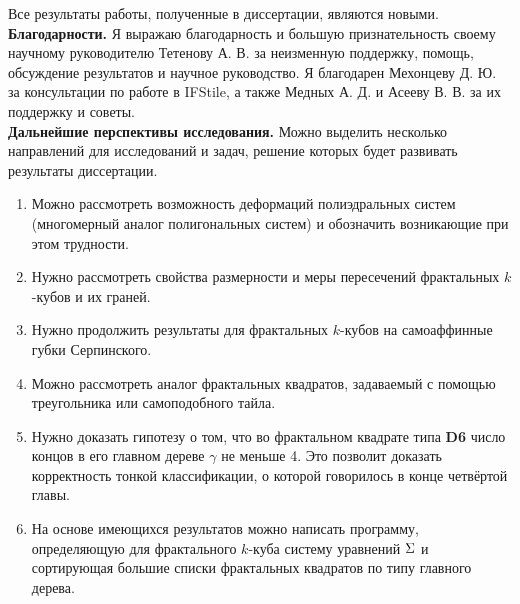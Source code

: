 Все результаты работы, полученные в диссертации, являются новыми.
\\

\textbf{Благодарности.}
Я выражаю благодарность и большую признательность своему научному руководителю Тетенову А. В. за неизменную поддержку, помощь, обсуждение результатов и научное руководство.
Я благодарен Мехонцеву Д. Ю.  за консультации по работе в IFStile, а также Медных А. Д. и Асееву В. В. за их поддержку и советы.\\


\textbf{Дальнейшие перспективы исследования.}
Можно выделить несколько направлений для исследований и задач, решение которых будет развивать результаты диссертации.
\begin{enumerate}
\item Можно рассмотреть возможность деформаций полиэдральных систем (многомерный аналог полигональных систем) и обозначить возникающие при этом трудности.
\item Нужно рассмотреть свойства размерности и меры пересечений фрактальных $k$-кубов и их граней.
\item Нужно продолжить результаты для фрактальных $k$-кубов на самоаффинные губки Серпинского.
\item Можно рассмотреть аналог фрактальных квадратов, задаваемый с помощью треугольника или самоподобного тайла.
\item Нужно доказать гипотезу о том, что во фрактальном квадрате типа {\bf D6} число концов в его главном дереве $\gamma$ не меньше 4. 
Это позволит доказать корректность тонкой классификации, о которой говорилось в конце четвёртой главы.
\item На основе имеющихся результатов можно написать программу, определяющую для фрактального $k$-куба систему уравнений $\Sigma$ и сортирующая большие списки фрактальных квадратов по типу главного дерева.
\end{enumerate}